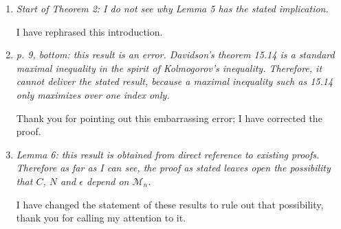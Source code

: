 \documentclass[12pt]{article}
\begin{document}
\begin{enumerate}
\item \emph{Start of Theorem 2: I do not see why Lemma 5 has the
    stated implication.}

  I have rephrased this introduction.

\item \emph{p. 9, bottom: this result is an error. Davidson's theorem
    15.14 is a standard maximal inequality in the spirit of
    Kolmogorov's inequality. Therefore, it cannot deliver the stated
    result, because a maximal inequality such as 15.14 only maximizes
    over one index only.}

  Thank you for pointing out this embarrassing error; I have corrected
  the proof.

\item \emph{Lemma 6: this result is obtained from direct reference to
    existing proofs. Therefore as far as I can see, the proof as
    stated leaves open the possibility that $C$, $N$ and $\epsilon$
    depend on $\mathcal{M}_n$.}

  I have changed the statement of these results to rule out that
  possibility, thank you for calling my attention to it.

\end{enumerate}
\end{document}
